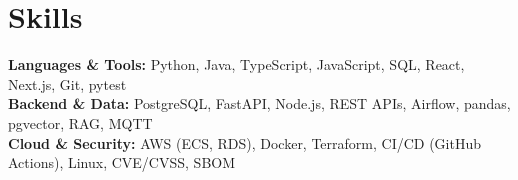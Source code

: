 \documentclass[letterpaper,10pt]{article}
\newif\ifentrygap
\let\entryorigsection\section
\renewcommand{\section}{\global\entrygapfalse\entryorigsection}
\begin{document}
\section{Skills}

\textbf{Languages \& Tools:} Python, Java, TypeScript, JavaScript, SQL, React, Next.js, Git, pytest \\
\textbf{Backend \& Data:} PostgreSQL, FastAPI, Node.js, REST APIs, Airflow, pandas, pgvector, RAG, MQTT \\
\textbf{Cloud \& Security:} AWS (ECS, RDS), Docker, Terraform, CI/CD (GitHub Actions), Linux, CVE/CVSS, SBOM
\end{document}
